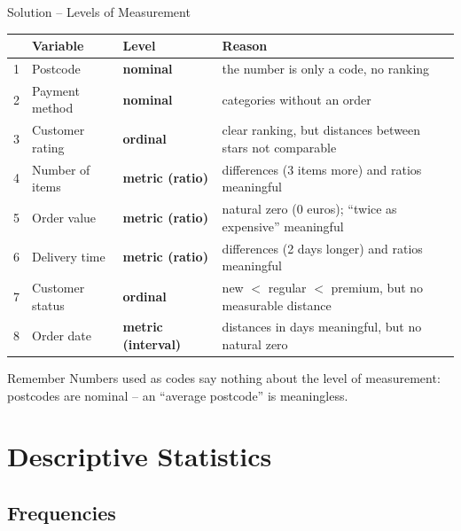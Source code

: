 \documentclass[aspectratio=169,11pt]{beamer}
\begin{document}
\begin{frame}{Solution -- Levels of Measurement}
  \begin{center}
    \renewcommand{\arraystretch}{1.05}
    \footnotesize
    \begin{tabular}{clll}
      \toprule
      & \textbf{Variable} & \textbf{Level} & \textbf{Reason} \\
      \midrule
      1 & Postcode & \textbf{nominal} & the number is only a code, no ranking \\
      2 & Payment method & \textbf{nominal} & categories without an order \\
      3 & Customer rating & \textbf{ordinal} & clear ranking, but distances between stars not comparable \\
      4 & Number of items & \textbf{metric (ratio)} & differences (3 items more) and ratios meaningful \\
      5 & Order value & \textbf{metric (ratio)} & natural zero (0 euros); ``twice as expensive'' meaningful \\
      6 & Delivery time & \textbf{metric (ratio)} & differences (2 days longer) and ratios meaningful \\
      7 & Customer status & \textbf{ordinal} & new $<$ regular $<$ premium, but no measurable distance \\
      8 & Order date & \textbf{metric (interval)} & distances in days meaningful, but no natural zero \\
      \bottomrule
    \end{tabular}
  \end{center}
  \begin{alertblock}{Remember}
    Numbers used as codes say nothing about the level of measurement: postcodes are nominal --
    an ``average postcode'' is meaningless.
  \end{alertblock}
\end{frame}

\section{Descriptive Statistics}

\subsection{Frequencies}
\end{document}
